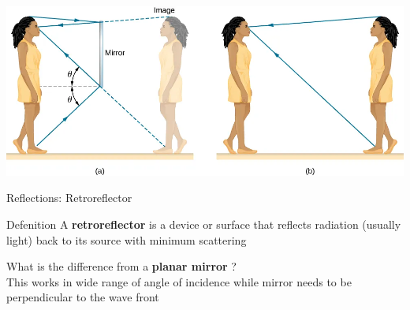 \documentclass{beamer}
\begin{document}
\begin{frame}
	\begin{center}
		\includegraphics[scale=0.3]{13.png}
	\end{center}
\end{frame}

\begin{frame}{Reflections: Retroreflector}
	\begin{block}{Defenition}
		A \textbf{retroreflector} is a device or surface that reflects radiation (usually light) back to its source with minimum scattering
	\end{block} 
	What is the difference from a \textbf{planar mirror} ? \\

	This works in wide range of angle of incidence while mirror needs to be perpendicular to the wave front
	
\end{frame}
\end{document}
